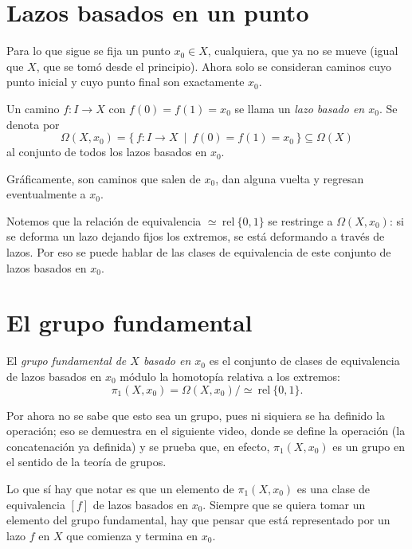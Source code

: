 \documentclass[11pt]{article}
\begin{document}
\section*{Lazos basados en un punto}

Para lo que sigue se fija un punto $x_0\in X$, cualquiera, que ya no se mueve (igual que $X$, que se tomó desde el principio). Ahora solo se consideran caminos cuyo punto inicial y cuyo punto final son exactamente $x_0$.

\begin{defn}
Un camino $f\colon I\to X$ con $f(0)=f(1)=x_0$ se llama un \emph{lazo basado en $x_0$}. Se denota por
\[
  \Omega(X,x_0)=\{\,f\colon I\to X\ \mid\ f(0)=f(1)=x_0\,\}\subseteq\Omega(X)
\]
al conjunto de todos los lazos basados en $x_0$.
\end{defn}

Gráficamente, son caminos que salen de $x_0$, dan alguna vuelta y regresan eventualmente a $x_0$.

Notemos que la relación de equivalencia $\simeq\ \mathrm{rel}\ \{0,1\}$ se restringe a $\Omega(X,x_0)$: si se deforma un lazo dejando fijos los extremos, se está deformando a través de lazos. Por eso se puede hablar de las clases de equivalencia de este conjunto de lazos basados en $x_0$.

\section*{El grupo fundamental}

\begin{defn}
El \emph{grupo fundamental de $X$ basado en $x_0$} es el conjunto de clases de equivalencia de lazos basados en $x_0$ módulo la homotopía relativa a los extremos:
\[
  \pi_1(X,x_0)=\Omega(X,x_0)\big/\!\simeq\ \mathrm{rel}\ \{0,1\}.
\]
\end{defn}

Por ahora no se sabe que esto sea un grupo, pues ni siquiera se ha definido la operación; eso se demuestra en el siguiente video, donde se define la operación (la concatenación ya definida) y se prueba que, en efecto, $\pi_1(X,x_0)$ es un grupo en el sentido de la teoría de grupos.

Lo que sí hay que notar es que un elemento de $\pi_1(X,x_0)$ es una clase de equivalencia $[f]$ de lazos basados en $x_0$. Siempre que se quiera tomar un elemento del grupo fundamental, hay que pensar que está representado por un lazo $f$ en $X$ que comienza y termina en $x_0$.

\begin{erratas}
\end{erratas}
\end{document}
